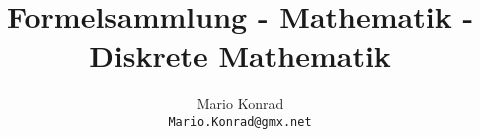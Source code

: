 \documentclass[10pt,a4paper,oneside]{article}
\begin{document}
\title{Formelsammlung - Mathematik - Diskrete Mathematik}
\author{Mario Konrad\\\texttt{Mario.Konrad@gmx.net}}
\maketitle
\tableofcontents

\end{document}
